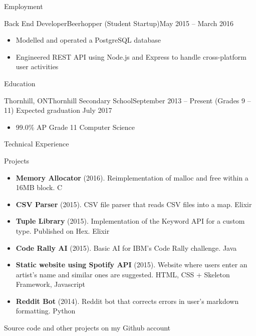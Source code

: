 \documentclass[]{mcdowellcv}
\begin{document}
	\makeheader

	\begin{cvsection}{Employment}
		\begin{cvsubsection}{Back End Developer}{Beerhopper (Student Startup)}{May 2015 -- March 2016}
			\begin{itemize}
				\item Modelled and operated a PostgreSQL database
				\item Engineered REST API using Node.js and Express to handle cross-platform user activities
			\end{itemize}
		\end{cvsubsection}
	\end{cvsection}

	\begin{cvsection}{Education}
		\begin{cvsubsection}{Thornhill, ON}{Thornhill Secondary School}{September 2013 -- Present (Grades 9 -- 11)}
            Expected graduation July 2017
			\begin{itemize}
				\item 99.0\% AP Grade 11 Computer Science
			\end{itemize}
		\end{cvsubsection}
	\end{cvsection}

	\begin{cvsection}{Technical Experience}
		\begin{cvsubsection}{Projects}{}{}
			\begin{itemize}
				\item \textbf{Memory Allocator} (2016). Reimplementation of malloc and free within a 16MB block.  C
				\item \textbf{CSV Parser} (2015). CSV file parser that reads CSV files into a map.  Elixir
				\item \textbf{Tuple Library} (2015). Implementation of the Keyword API for a custom type. Published on Hex.  Elixir
				\item \textbf{Code Rally AI} (2015). Basic AI for IBM's Code Rally challenge.  Java
				\item \textbf{Static website using Spotify API} (2015). Website where users enter an artist's name and similar ones are suggested.  HTML, CSS + Skeleton Framework, Javascript
				\item \textbf{Reddit Bot} (2014). Reddit bot that corrects errors in user's markdown formatting.  Python
			\end{itemize}
            Source code and other projects on my Github account
		\end{cvsubsection}
	\end{cvsection}
\end{document}
